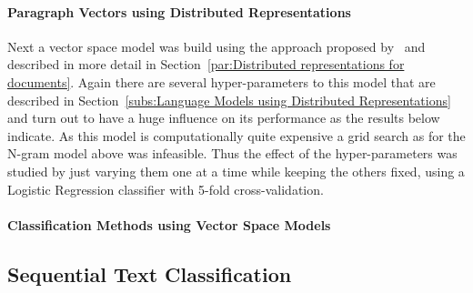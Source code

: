 \paragraph{Paragraph Vectors using Distributed Representations}
\label{par:Paragraph Vectors using Distributed Representations}

Next a vector space model was build using the approach proposed by~\cite{Le:2014aa} and described in more detail in Section~\ref{par:Distributed representations for documents}. Again there are several hyper-parameters to this model that are described in Section~\ref{subs:Language Models using Distributed Representations} and turn out to have a huge influence on its performance as the results below indicate. As this model is computationally quite expensive a grid search as for the N-gram model above was infeasible. Thus the effect of the hyper-parameters was studied by just varying them one at a time while keeping the others fixed, using a Logistic Regression classifier with 5-fold cross-validation.

\paragraph{Classification Methods using Vector Space Models}
\label{par:Classification Methods using Vector Space Models}

\subsection{Sequential Text Classification}
